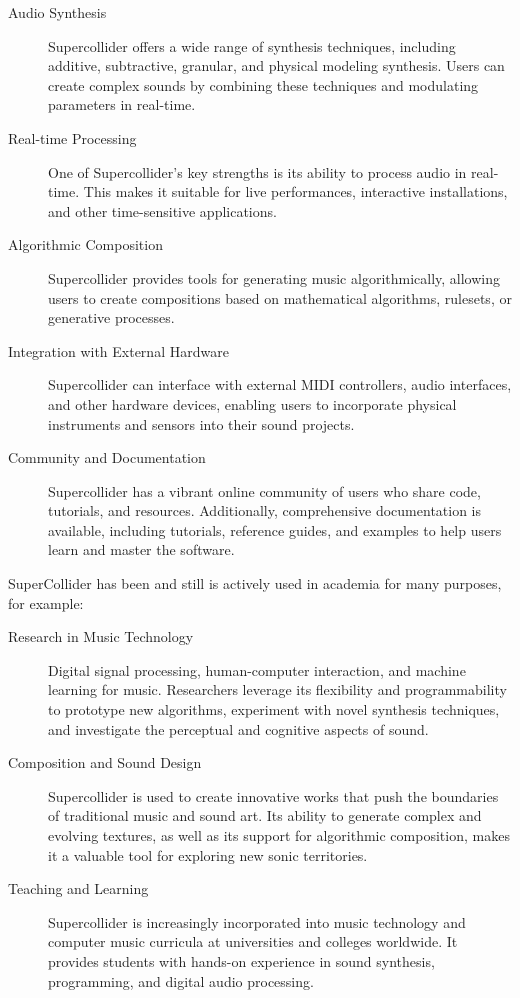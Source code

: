 \documentclass[a4paper]{book}
\begin{document}
\begin{description}
	\item[Audio Synthesis] Supercollider offers a wide range of synthesis techniques, including additive, subtractive, granular, and physical modeling synthesis. Users can create complex sounds by combining these techniques and modulating parameters in real-time.
	\item[Real-time Processing] One of Supercollider's key strengths is its ability to process audio in real-time. This makes it suitable for live performances, interactive installations, and other time-sensitive applications.
	\item[Algorithmic Composition] Supercollider provides tools for generating music algorithmically, allowing users to create compositions based on mathematical algorithms, rulesets, or generative processes.
	\item[Integration with External Hardware] Supercollider can interface with external MIDI controllers, audio interfaces, and other hardware devices, enabling users to incorporate physical instruments and sensors into their sound projects.
	\item[Community and Documentation] Supercollider has a vibrant online community of users who share code, tutorials, and resources. Additionally, comprehensive documentation is available, including tutorials, reference guides, and examples to help users learn and master the software.
	
	
\end{description}

SuperCollider has been and still is actively used in academia for many purposes, for example:
\begin{description}
	\item[Research in Music Technology] Digital signal processing, human-computer interaction, and machine learning for music. Researchers leverage its flexibility and programmability to prototype new algorithms, experiment with novel synthesis techniques, and investigate the perceptual and cognitive aspects of sound.
	\item[Composition and Sound Design] Supercollider is used to create innovative works that push the boundaries of traditional music and sound art. Its ability to generate complex and evolving textures, as well as its support for algorithmic composition, makes it a valuable tool for exploring new sonic territories.
	\item[Teaching and Learning] Supercollider is increasingly incorporated into music technology and computer music curricula at universities and colleges worldwide. It provides students with hands-on experience in sound synthesis, programming, and digital audio processing.

\end{description} 
\end{document}
